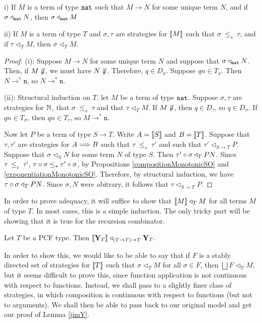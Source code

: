 \documentclass{entcs} \usepackage{prentcsmacro}
\newcommand{\stle}{{\;\le_s\;}}
\newcommand{\exlub}{\bigsqcup}
\newcommand{\opto}{\longrightarrow}
\newcommand{\n}{{\mathtt{n}}}
\newcommand{\0}{{\mathtt{0}}}
\newcommand{\plot}{\triangleleft}
\begin{document}
\begin{lemma}
  \label{jims2ndLemma}
  i) If $M$ is a term of type ${\mathtt{nat}}$ such that $M\opto N$ for some unique term $N$, and if $\sigma\plot_\nat N$, then $\sigma\plot_\nat M$

  ii) If $M$ is a term of type $T$ and $\sigma,\tau$ are strategies for $\left\llbracket M\right\rrbracket$ such that $\sigma\stle\tau$, and if $\tau\plot_TM$, then $\sigma\plot_TM$.
\end{lemma}
  \begin{proof}
    (i): Suppose $M\opto N$ for some unique term $N$ and suppose that $\sigma\plot_\nat N$.  Then, if $M\not\Downarrow$, we must have $N\not\Downarrow$.  Therefore, $q\in D_\sigma$.  Suppose $qn\in T_\sigma$.  Then $N\opto^*\n$, so $N\opto^*\n$.

    (ii): Structural induction on $T$.  let $M$ be a term of type ${\mathtt{nat}}$.  Suppose $\sigma,\tau$ are strategies for $\mathbb{N}$, that $\sigma\stle\tau$ and that $\tau\plot_T M$.  If $M\not\Downarrow$, then $q\in D_\tau$, so $q\in D_\sigma$.  If $qn\in T_\sigma$, then $qn\in T_\tau$, so $M\opto^*\n$.

        Now let $P$ be a term of type $S\to T$.  Write $A=\left\llbracket S\right\rrbracket$ and $B=\left\llbracket T\right\rrbracket$.  Suppose that $\tau,\tau'$ are strategies for $A\Longrightarrow B$ such that $\tau\stle\tau'$ and such that $\tau'\plot_{S\to T}P$.  Suppose that $\sigma\plot_SN$ for some term $N$ of type $S$.  Then $\icomp{\tau'}{\sigma}\plot_TPN$.  Since $\tau\stle\tau'$, $\icomp{\tau}{\sigma}\stle\icomp{\tau'}{\sigma}$, by Propositions \ref{compositionMonotonicSO} and \ref{exponentiationMonotonicSO}.  Therefore, by structural induction, we have $\icomp{\tau}{\sigma}\plot_TPN$.  Since $\sigma,N$ were abitrary, it follows that $\tau\plot_{S\to T}P$.
  \end{proof}

In order to prove adequacy, it will suffice to show that $\deno{M}\plot_TM$ for all terms $M$ of type $T$.  In most cases, this is a simple induction.  The only tricky part will be showing that it is true for the recursion combinator.

\begin{lemma}
  \label{jimY}
  Let $T$ be a PCF type.  Then $\deno{\Y_T}\plot_{(T\to T)\to T}\Y_T$.
\end{lemma}

  In order to show this, we would like to be able to say that if $F$ is a stably directed set of strategies for $\left\llbracket T\right\rrbracket$ such that $\sigma\plot_T M$ for all $\sigma\in F$, then $\exlub F\plot_TM$, but it seems difficult to prove this, since function application is not continuous with respect to functions.  Instead, we shall pass to a slightly finer class of strategies, in which composition is continuous with respect to functions (but not to arguments).  We shall then be able to pass back to our original model and get our proof of Lemma \ref{jimY}.
\end{document}
